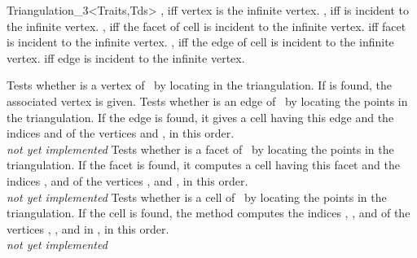 \begin{ccClassTemplate}{Triangulation_3<Traits,Tds>}
{, iff vertex  is the infinite vertex.}
\ccGlue
{}
{, iff  is incident to the infinite vertex.
}
\ccGlue
{}
{, iff the facet  of cell  is incident to the
infinite vertex.
} 
\ccGlue
{}
{ iff facet  is incident to the infinite vertex.
}
\ccGlue
{}
{, iff the edge  of cell  is incident to
the infinite vertex.
} 
\ccGlue
{}
{ iff edge  is incident to the infinite vertex.
}


{Tests whether  is a vertex of \ccVar\ by locating  in
the triangulation. If  is found, the associated vertex 
is given.}
\ccGlue
{}
{Tests whether  is an edge of \ccVar\ by locating the points 
in the triangulation. If the edge is found,
it gives a cell  having this edge and the indices 
and  of the vertices  and , in this order.  
\\
\textit{not yet implemented}}
\ccGlue
{}
{Tests whether  is a facet of \ccVar\ by locating the points 
in the triangulation. If the facet is found,
it computes a cell  having this facet and the indices ,
 and  of the vertices ,  and , in
this order.  
\\
\textit{not yet implemented}}
\ccGlue
{}
{Tests whether  is a cell of \ccVar\ by locating the points 
in the triangulation. If the cell  is found, the method
computes the indices , ,  and  of the
vertices , ,  and  in , in this
order. 
\\
\textit{not yet implemented}}


\end{ccClassTemplate}
